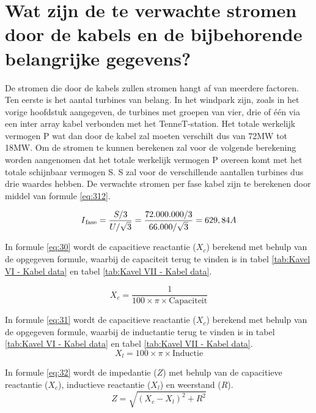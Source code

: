 \section{Wat zijn de te verwachte stromen door de kabels en de bijbehorende belangrijke gegevens?}

De stromen die door de kabels zullen stromen hangt af van meerdere factoren. Ten eerste is het aantal turbines van belang. In het windpark zijn, zoals in het vorige hoofdstuk aangegeven, de turbines met groepen van vier, drie of één via een inter array kabel verbonden met het TenneT-station. Het totale werkelijk vermogen P wat dan door de kabel zal moeten verschilt dus van 72MW tot 18MW. Om de stromen te kunnen berekenen zal voor de volgende berekening worden aangenomen dat het totale werkelijk vermogen P overeen komt met het totale schijnbaar vermogen S. S zal voor de verschillende aantallen turbines dus drie waardes hebben. 
De verwachte stromen per fase kabel zijn te berekenen door middel van formule \ref{eq:312}. 

\begin{equation} \label{eq:312}
I\textsubscript{fase} = \frac{S/3}{U/ \sqrt{3}} = \frac{72.000.000/3}{66.000/ \sqrt{3}} = 629,84 A
\end{equation}

In formule \ref{eq:30} wordt de capacitieve reactantie (\(X_c\)) berekend met behulp van de opgegeven formule, waarbij de capaciteit terug te vinden is in tabel \ref{tab:Kavel VI - Kabel data} en tabel \ref{tab:Kavel VII - Kabel data}.

\begin{equation} \label{eq:30}
X_c = \frac{1}{{100 \times \pi \times \text{{Capaciteit}}}}
\end{equation}

In formule \ref{eq:31} wordt de capacitieve reactantie (\(X_c\)) berekend met behulp van de opgegeven formule, waarbij de inductantie terug te vinden is in tabel \ref{tab:Kavel VI - Kabel data} en tabel \ref{tab:Kavel VII - Kabel data}.
\begin{equation} \label{eq:31}
X_l = 100 \times \pi \times \text{{Inductie}}
\end{equation}

In formule \ref{eq:32} wordt de impedantie (\(Z\)) met behulp van de capacitieve reactantie (\(X_c\)), inductieve reactantie (\(X_l\)) en weerstand (\(R\)).
\begin{equation} \label{eq:32}
Z = \sqrt{{(X_c - X_l)^2 + R^2}}
\end{equation}


